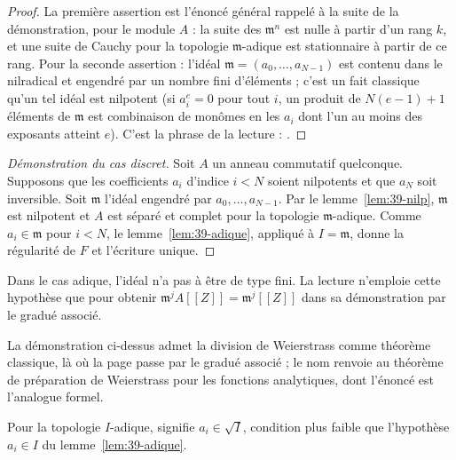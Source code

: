 \begin{proof}
La première assertion est l'énoncé général rappelé à la suite de la démonstration, pour le module $A$ : la suite des $\mathfrak m^n$ est nulle à partir d'un rang $k$, et une suite de Cauchy pour la topologie $\mathfrak m$-adique est stationnaire à partir de ce rang. Pour la seconde assertion : l'idéal $\mathfrak m = (a_0, \dots, a_{N-1})$ est contenu dans le nilradical et engendré par un nombre fini d'éléments ; c'est un fait classique qu'un tel idéal est nilpotent (si $a_i^{e} = 0$ pour tout $i$, un produit de $N(e-1)+1$ éléments de $\mathfrak m$ est combinaison de monômes en les $a_i$ dont l'un au moins des exposants atteint $e$). C'est la phrase de la lecture : .
\end{proof}

\begin{proof}[Démonstration du cas discret]
Soit $A$ un anneau commutatif quelconque. Supposons que les coefficients $a_i$ d'indice $i < N$ soient nilpotents et que $a_N$ soit inversible. Soit $\mathfrak m$ l'idéal engendré par $a_0, \dots, a_{N-1}$. Par le lemme~\ref{lem:39-nilp}, $\mathfrak m$ est nilpotent et $A$ est séparé et complet pour la topologie $\mathfrak m$-adique. Comme $a_i \in \mathfrak m$ pour $i < N$, le lemme~\ref{lem:39-adique}, appliqué à $I = \mathfrak m$, donne la régularité de $F$ et l'écriture unique.
\end{proof}

\begin{remarque}
Dans le cas adique, l'idéal n'a pas à être de type fini. La lecture n'emploie cette hypothèse que pour obtenir $\mathfrak m^j A[[Z]] = \mathfrak m^j[[Z]]$ dans sa démonstration par le gradué associé.
\end{remarque}

\begin{remarque}
La démonstration ci-dessus admet la division de Weierstrass comme théorème classique, là où la page passe par le gradué associé ; le nom renvoie au théorème de préparation de Weierstrass pour les fonctions analytiques, dont l'énoncé est l'analogue formel.
\end{remarque}

\begin{remarque}
Pour la topologie $I$-adique,  signifie $a_i \in \sqrt I$, condition plus faible que l'hypothèse $a_i \in I$ du lemme~\ref{lem:39-adique}.
\end{remarque}

